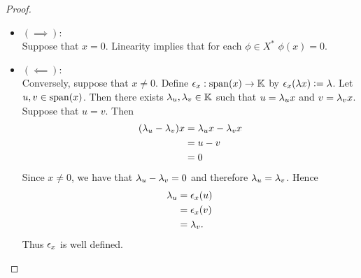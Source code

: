 \documentclass{book}
\begin{document}
	\begin{proof}\
		\begin{itemize}
			\item $(\implies):$ \\
			Suppose that $x = 0$. Linearity implies that for each $\phi \in X^*$ $\phi(x) = 0$. 
			\item $(\impliedby):$ \\
			Conversely, suppose that $x \neq 0$. Define $\epsilon_x: \operatorname{span}(x) \rightarrow \mathbb{K}$ by $\epsilon_x(\lambda x) \vcentcolon= \lambda$. Let $u,v \in \operatorname{span}(x)$. Then there exists $\lambda_u, \lambda_v \in \mathbb{K}$ such that $u = \lambda_u x$ and $v = \lambda_v x$. Suppose that $u = v$. Then 
			\begin{align*}
				(\lambda_u - \lambda_v)x
				& = \lambda_u x - \lambda_v x \\
				& = u - v \\
				& = 0
			\end{align*}
			Since $x \neq 0$, we have that $\lambda_u - \lambda_v = 0$ and therefore $\lambda_u = \lambda_v$. Hence  
			\begin{align*}
				\lambda_u 
				& = \epsilon_x(u) \\
				& = \epsilon_x(v) \\
				& = \lambda_v.
			\end{align*}
			Thus $\epsilon_x$ is well defined. 
		\end{itemize}
	\end{proof}
	
	
	
	
	
	
	
	
	
	
	
	
	
	
	
	
	
	
	
	
	
	
	
	
	
	
	
	
	
	
	
	
	
	
	
	
	
	
	
	
	
	
	
	
	
	
	
	
	
	
	
	
	
\end{document}
